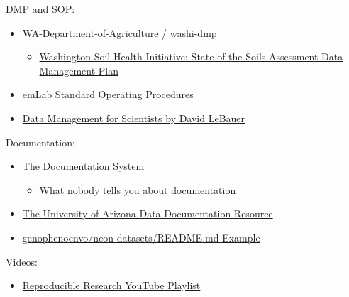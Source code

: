 \documentclass[
  letterpaper,
  DIV=11,
  numbers=noendperiod]{scrreprt}
\providecommand{\tightlist}{%
  \setlength{\itemsep}{0pt}\setlength{\parskip}{0pt}}\usepackage{longtable,booktabs,array}
\begin{document}

DMP and SOP:

\begin{itemize}
\tightlist
\item
  \href{https://github.com/WA-Department-of-Agriculture/washi-dmp}{WA-Department-of-Agriculture
  / washi-dmp}

  \begin{itemize}
  \tightlist
  \item
    \href{https://wa-department-of-agriculture.github.io/washi-dmp/}{Washington
    Soil Health Initiative: State of the Soils Assessment Data
    Management Plan}
  \end{itemize}
\item
  \href{https://emlab-ucsb.github.io/SOP/}{emLab Standard Operating
  Procedures}
\item
  \href{https://www.youtube.com/watch?v=m29u6OniOGQ&t=3446s}{Data
  Management for Scientists by David LeBauer}
\end{itemize}

Documentation:

\begin{itemize}
\tightlist
\item
  \href{https://documentation.divio.com/}{The Documentation System}

  \begin{itemize}
  \tightlist
  \item
    \href{https://www.youtube.com/watch?v=t4vKPhjcMZg}{What nobody tells
    you about documentation}
  \end{itemize}
\item
  \href{https://data.library.arizona.edu/data-management/best-practices/data-documentation-readme-metadata}{The
  University of Arizona Data Documentation Resource}\\
\item
  \href{https://github.com/genophenoenvo/neon-datasets/blob/main/README.md}{genophenoenvo/neon-datasets/README.md
  Example}
\end{itemize}

Videos:

\begin{itemize}
\tightlist
\item
  \href{https://www.youtube.com/playlist?list=PLy_EwS4oOnoQzWYaWDO_x5t7O1RqHwuhw}{Reproducible
  Research YouTube Playlist}
\end{itemize}
\end{document}
